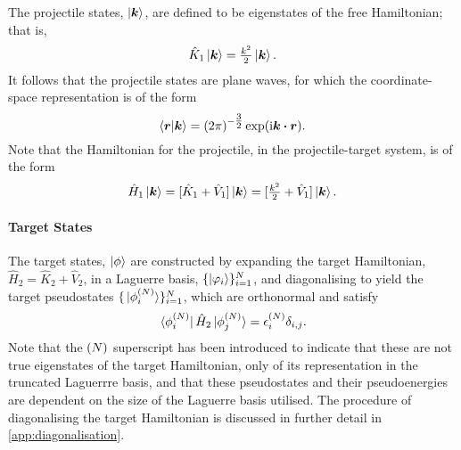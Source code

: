 \documentclass[draft]{article}
\begin{document}
The projectile states, $\ket{\boldsymbol{k}}$, are defined to be eigenstates of
the free Hamiltonian; that is,
\begin{equation}
  \label{eq:projectile-free-hamiltonian}
  \hat{K}_{1}
  \ket{\boldsymbol{k}}
  =
  \tfrac{k^{2}}{2}
  \ket{\boldsymbol{k}}
  .
\end{equation}
It follows that the projectile states are plane waves, for which the
coordinate-space representation is of the form
\begin{equation}
  \label{eq:projectile-states}
  \bra{\boldsymbol{r}}
  \ket{\boldsymbol{k}}
  =
  \lr{2 \pi}^{-\tfrac{3}{2}}
  \exponential\lr
  {
    \imath
    \boldsymbol{k}
    \vdot
    \boldsymbol{r}
  }
  .
\end{equation}
Note that the Hamiltonian for the projectile, in the projectile-target system,
is of the form
\begin{equation}
  \label{eq:projectile-hamiltonian}
  \hat{H}_{1}
  \ket{\boldsymbol{k}}
  =
  [
    \hat{K}_{1}
    +
    \hat{V}_{1}
  ]
  \ket{\boldsymbol{k}}
  =
  [
    \tfrac{k^{2}}{2}
    +
    \hat{V}_{1}
  ]
  \ket{\boldsymbol{k}}
  .
\end{equation}

\paragraph{Target States}

The target states, $\ket{\phi}$ are constructed by expanding the target
Hamiltonian, $\hat{H}_{2} = \hat{K}_{2} + \hat{V}_{2}$,
in a Laguerre basis, $\lbrace\ket{\varphi_{i}}\rbrace_{i = 1}^{N}$, and diagonalising
to yield the target pseudostates
$\lbrace\ket*{\phi_{i}^{(N)}}\rbrace_{i = 1}^{N}$, which are orthonormal and satisfy
\begin{equation}
  \label{eq:target-hamiltonian}
  \bra*{\phi_{i}^{(N)}}
  \hat{H}_{2}
  \ket*{\phi_{j}^{(N)}}
  =
  \epsilon_{i}^{(N)}
  \delta_{i, j}
  .
\end{equation}
Note that the $(N)$ superscript has been introduced to indicate that these
are not true eigenstates of the target Hamiltonian, only of its representation
in the truncated Laguerrre basis, and that these pseudostates and their
pseudoenergies are dependent on the size of the Laguerre basis utilised.
The procedure of diagonalising the target Hamiltonian is discussed in further
detail in \autoref{app:diagonalisation}.
\end{document}
